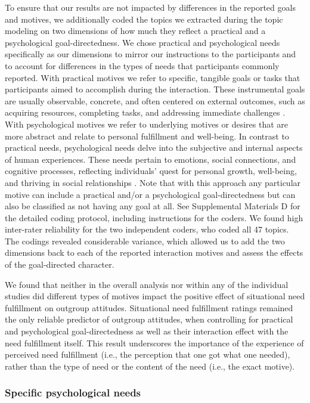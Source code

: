 To ensure that our results are not impacted by differences in the
reported goals and motives, we additionally coded the topics we
extracted during the topic modeling on two dimensions of how much they
reflect a practical and a psychological goal-directedness. We chose
practical and psychological needs specifically as our dimensions to
mirror our instructions to the participants and to account for
differences in the types of needs that participants commonly reported.
With practical motives we refer to specific, tangible goals or tasks
that participants aimed to accomplish during the interaction. These
instrumental goals are usually observable, concrete, and often centered
on external outcomes, such as acquiring resources, completing tasks, and
addressing immediate challenges \citep[e.g.,][]{oduntan2019}. With
psychological motives we refer to underlying motives or desires that are
more abstract and relate to personal fulfillment and well-being. In
contrast to practical needs, psychological needs delve into the
subjective and internal aspects of human experiences. These needs
pertain to emotions, social connections, and cognitive processes,
reflecting individuals' quest for personal growth, well-being, and
thriving in social relationships \citep[e.g.,][]{dweck2017}. Note that
with this approach any particular motive can include a practical and/or
a psychological goal-directedness but can also be classified as not
having any goal at all. See Supplemental Materials D for the detailed
coding protocol, including instructions for the coders. We found high
inter-rater reliability for the two independent coders, who coded all 47
topics. The codings revealed considerable variance, which allowed us to
add the two dimensions back to each of the reported interaction motives
and assess the effects of the goal-directed character.

We found that neither in the overall analysis nor within any of the
individual studies did different types of motives impact the positive
effect of situational need fulfillment on outgroup attitudes.
Situational need fulfillment ratings remained the only reliable
predictor of outgroup attitudes, when controlling for practical and
psychological goal-directedness as well as their interaction effect with
the need fulfillment itself. This result underscores the importance of
the experience of perceived need fulfillment (i.e., the perception that
one got what one needed), rather than the type of need or the content of
the need (i.e., the exact motive).

\subsubsection{Specific psychological needs}

